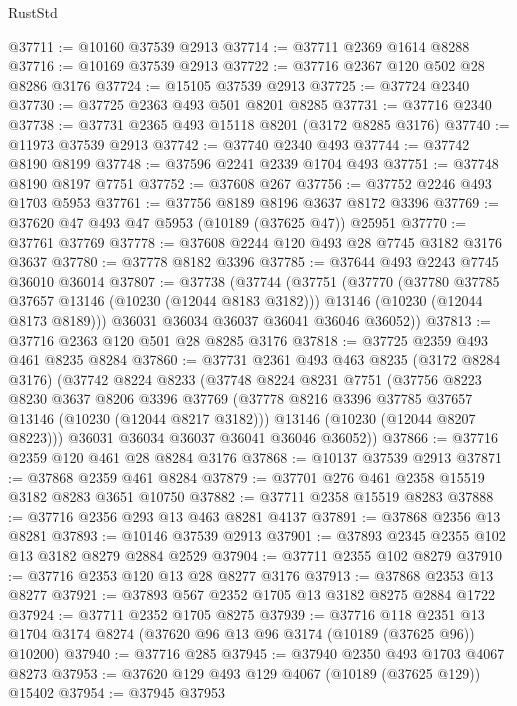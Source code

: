 \begin{lexlean}{RustStd}
\begin{coremodule}
@37711 := @10160 @37539 @2913
@37714 := @37711 @2369 @1614 @8288
@37716 := @10169 @37539 @2913
@37722 := @37716 @2367 @120 @502 @28 @8286 @3176
@37724 := @15105 @37539 @2913
@37725 := @37724 @2340
@37730 := @37725 @2363 @493 @501 @8201 @8285
@37731 := @37716 @2340
@37738 := @37731 @2365 @493 @15118 @8201 (@3172 @8285 @3176)
@37740 := @11973 @37539 @2913
@37742 := @37740 @2340 @493
@37744 := @37742 @8190 @8199
@37748 := @37596 @2241 @2339 @1704 @493
@37751 := @37748 @8190 @8197 @7751
@37752 := @37608 @267
@37756 := @37752 @2246 @493 @1703 @5953
@37761 := @37756 @8189 @8196 @3637 @8172 @3396
@37769 := @37620 @47 @493 @47 @5953 (@10189 (@37625 @47)) @25951
@37770 := @37761 @37769
@37778 := @37608 @2244 @120 @493 @28 @7745 @3182 @3176 @3637
@37780 := @37778 @8182 @3396
@37785 := @37644 @493 @2243 @7745 @36010 @36014
@37807 := @37738
    (@37744
      (@37751
        (@37770
          (@37780 @37785 @37657 @13146 (@10230 (@12044 @8183 @3182)))
          @13146
          (@10230 (@12044 @8173 @8189)))
        @36031
        @36034
        @36037
        @36041
        @36046
        @36052))
@37813 := @37716 @2363 @120 @501 @28 @8285 @3176
@37818 := @37725 @2359 @493 @461 @8235 @8284
@37860 := @37731
    @2361
    @493
    @463
    @8235
    (@3172 @8284 @3176)
    (@37742
      @8224
      @8233
      (@37748
        @8224
        @8231
        @7751
        (@37756
          @8223
          @8230
          @3637
          @8206
          @3396
          @37769
          (@37778 @8216 @3396 @37785 @37657 @13146 (@10230 (@12044 @8217 @3182)))
          @13146
          (@10230 (@12044 @8207 @8223)))
        @36031
        @36034
        @36037
        @36041
        @36046
        @36052))
@37866 := @37716 @2359 @120 @461 @28 @8284 @3176
@37868 := @10137 @37539 @2913
@37871 := @37868 @2359 @461 @8284
@37879 := @37701 @276 @461 @2358 @15519 @3182 @8283 @3651 @10750
@37882 := @37711 @2358 @15519 @8283
@37888 := @37716 @2356 @293 @13 @463 @8281 @4137
@37891 := @37868 @2356 @13 @8281
@37893 := @10146 @37539 @2913
@37901 := @37893 @2345 @2355 @102 @13 @3182 @8279 @2884 @2529
@37904 := @37711 @2355 @102 @8279
@37910 := @37716 @2353 @120 @13 @28 @8277 @3176
@37913 := @37868 @2353 @13 @8277
@37921 := @37893 @567 @2352 @1705 @13 @3182 @8275 @2884 @1722
@37924 := @37711 @2352 @1705 @8275
@37939 := @37716
    @118
    @2351
    @13
    @1704
    @3174
    @8274
    (@37620 @96 @13 @96 @3174 (@10189 (@37625 @96)) @10200)
@37940 := @37716 @285
@37945 := @37940 @2350 @493 @1703 @4067 @8273
@37953 := @37620 @129 @493 @129 @4067 (@10189 (@37625 @129)) @15402
@37954 := @37945 @37953

\end{coremodule}
\end{lexlean}
